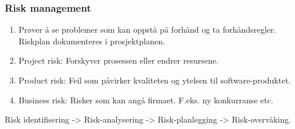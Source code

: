 \documentclass[11pt]{article}
\begin{document}
\subsubsection{Risk management}
\label{sec-5.3.3}


\begin{enumerate}
\item Prøver å se problemer som kan oppstå på forhånd og ta forhåndsregler. Riskplan dokumenteres i prosjektplanen.
\item Project risk: 
       Forskyver prosessen eller endrer resursene.
\item Product risk: 
       Feil som påvirker kvaliteten og ytelsen til software-produktet.
\item Business risk: 
       Risker som kan angå firmaet. F.eks. ny konkurranse etc.
\end{enumerate}

    Risk identifisering -> Risk-analysering -> Risk-planlegging -> Risk-overvåking.
\end{document}
